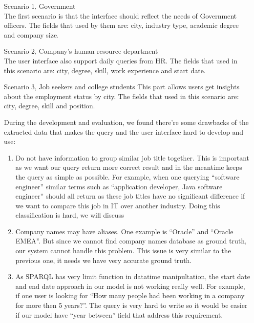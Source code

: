 \begin{description}
	\item Scenario 1, Government \hfill \\
	The first scenario is that the interface should reflect the needs of Government officers. The fields that used by them are: city, industry type, academic degree and company size.
	\item Scenario 2, Company's human resource department \hfill \\
	The user interface also support daily queries from HR. The fields that used in this scenario are: city, degree, skill, work experience and start date.
	\item Scenario 3, Job seekers and college students
	This part allows users get insights about the employment status by city. The fields that used in this scenario are: city, degree, skill and position.
\end{description}

During the development and evaluation, we found there're some drawbacks of the extracted data that makes the query and the user interface hard to develop and use:
\begin{enumerate}
	\item Do not have information to group similar job title together. This is important as we want our query return more correct result and in the meantime keeps the query as simple as possible. For example, when one querying ``software engineer'' similar terms such as ``application developer, Java software engineer'' should all return as these job titles have no significant difference if we want to compare this job in IT over another industry. Doing this classification is hard, we will discuss 
	\item Company names may have aliases. One example is ``Oracle'' and ``Oracle EMEA''. But since we cannot find company names database as ground truth, our system cannot handle this problem. This issue is very similar to the previous one, it needs we have very accurate ground truth.
	\item As SPARQL has very limit function in datatime manipultation, the start date and end date approach in our model is not working really well. For example, if one user is looking for ``How many people had been working in a company for more then 5 years?''. The query is very hard to write so it would be easier if our model have ``year between'' field that address this requirement.
\end{enumerate}

